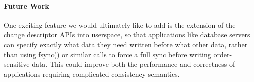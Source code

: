 \preparagraphspacing{}
\paragraph{Future Work}
\label{sec:future}

One exciting feature we would ultimately like to add is the extension of the
change descriptor APIs into userspace, so that applications like database
servers can specify exactly what data they need written before what other data,
rather than using fsync() or similar calls to force a full sync before writing
order-sensitive data. This could improve both the performance and correctness of
applications requiring complicated consistency semantics.
